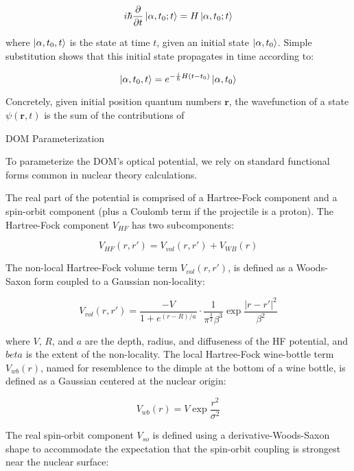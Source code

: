 \begin{equation}
    i\hbar\frac{\partial}{\partial t}\ket{\alpha, t_{0};t} = H\ket{\alpha,
    t_{0}; t}
\end{equation}

where $\ket{\alpha, t_{0},t}$ is the state at time $t$, given an initial state
$\ket{\alpha, t_{0}}$. Simple substitution shows that this initial state
propagates in time according to:

\begin{equation}
    \ket{\alpha, t_{0}, t} = e^{-\frac{i}{\hbar}H(t-t_{0})}\ket{\alpha, t_{0}}
\end{equation}

Concretely, given initial position quantum numbers $\bm{r}$, the wavefunction
of a state $\psi(\bm{r},t)$ is the sum of the contributions of 

DOM Parameterization

To parameterize the DOM's optical potential, we rely on standard functional
forms common in nuclear theory calculations.

The real part of the potential is comprised of a Hartree-Fock component and
a spin-orbit component (plus a Coulomb term if the projectile is a proton).
The Hartree-Fock component $V_{HF}$ has two subcomponents:

\begin{equation}
    V_{HF}(r,r') = V_{vol}(r,r') + V_{WB}(r)
\end{equation}

The non-local Hartree-Fock volume term $V_{vol}(r,r')$, is defined as
a Woods-Saxon form coupled to a Gaussian non-locality:

\begin{equation}
    V_{vol}(r,r') =
    \dfrac{-V}{1+e^{(r-R)/a}}\cdot\dfrac{1}{\pi^{\frac{3}{2}}\beta^{3}}
    \exp{\frac{|r-r'|^{2}}{\beta^{2}}}
\end{equation}

where $V$, $R$, and $a$ are the depth, radius, and diffuseness of the HF potential,
and $beta$ is the extent of the non-locality. The local Hartree-Fock wine-bottle
term $V_{wb}(r)$, named for resemblence to the dimple at the bottom of a wine
bottle, is defined as a Gaussian centered at the nuclear origin:

\begin{equation}
    V_{wb}(r) = V\exp{\frac{r^{2}}{\sigma^{2}}}
\end{equation}

The real spin-orbit component $V_{so}$
is defined using a derivative-Woods-Saxon shape to
accommodate the expectation that the spin-orbit coupling is strongest near the
nuclear surface:

